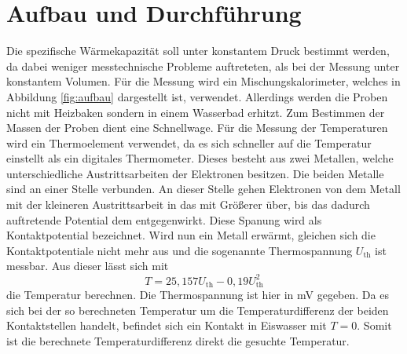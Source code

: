 \section{Aufbau und Durchführung}
\label{sec:durchfuehrung}
Die spezifische Wärmekapazität soll unter konstantem Druck bestimmt werden, da dabei weniger messtechnische Probleme auftreteten, als bei der Messung unter konstantem Volumen.
Für die Messung wird ein Mischungskalorimeter, welches in Abbildung \ref{fig:aufbau} dargestellt ist, verwendet. Allerdings werden die Proben nicht mit Heizbaken sondern in einem Wasserbad erhitzt. Zum Bestimmen der Massen der Proben dient eine Schnellwage.
Für die Messung der Temperaturen wird ein Thermoelement verwendet, da es sich schneller auf die Temperatur einstellt als ein digitales Thermometer. Dieses besteht aus zwei Metallen, welche unterschiedliche Austrittsarbeiten der Elektronen besitzen. Die beiden Metalle sind an einer Stelle verbunden. An dieser Stelle gehen Elektronen von dem Metall mit der kleineren Austrittsarbeit in das mit Größerer über, bis das dadurch auftretende Potential dem entgegenwirkt. Diese Spanung wird als Kontaktpotential bezeichnet. Wird nun ein Metall erwärmt, gleichen sich die Kontaktpotentiale nicht mehr aus und die sogenannte Thermospannung $U_\mathrm{th}$ ist messbar.
Aus dieser lässt sich mit
\begin{equation}
  T = 25,157 U_\mathrm{th} - 0,19 U_\mathrm{th}^2
\end{equation}
die Temperatur berechnen. Die Thermospannung ist hier in \si{\milli\volt} gegeben. Da es sich bei der so berechneten Temperatur um die Temperaturdifferenz der beiden Kontaktstellen handelt, befindet sich ein Kontakt in Eiswasser mit $T=0$. Somit ist die berechnete Temperaturdifferenz direkt die gesuchte Temperatur.


